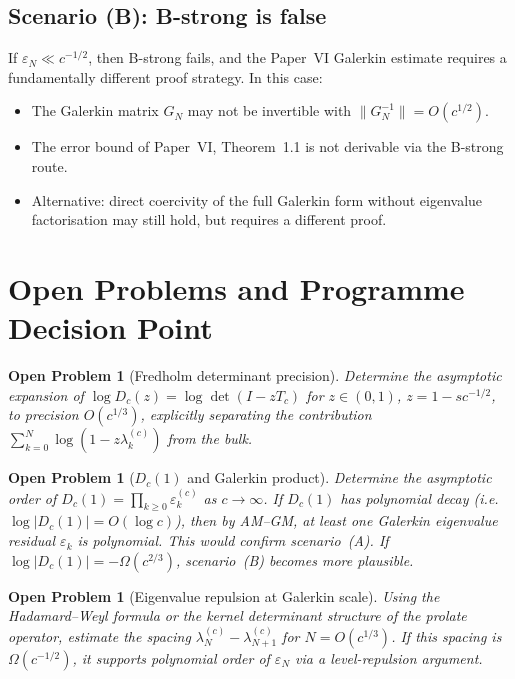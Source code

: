 \documentclass[12pt,a4paper]{article}
\newtheorem{openproblem}[theorem]{Open Problem}
\newcommand{\lam}[1]{\lambda_{#1}^{(c)}}
\newcommand{\Tc}{T_c}
\newcommand{\Dc}{D_c}
\begin{document}
\subsection{Scenario (B): B-strong is false}

If $\varepsilon_N \ll c^{-1/2}$, then B-strong fails,
and the Paper~VI Galerkin estimate requires
a fundamentally different proof strategy.
In this case:
\begin{itemize}[nosep]
  \item The Galerkin matrix $G_N$ may not be
        invertible with $\|G_N^{-1}\| = O(c^{1/2})$.
  \item The error bound of Paper~VI, Theorem~1.1
        is not derivable via the B-strong route.
  \item Alternative: direct coercivity of the
        full Galerkin form without eigenvalue
        factorisation may still hold, but
        requires a different proof.
\end{itemize}

\section{Open Problems and Programme Decision Point}
\label{sec:decision}

\begin{openproblem}[Fredholm determinant precision]
\label{op:fredholm_precision}
Determine the asymptotic expansion of
$\log \Dc(z) = \log \det(I - z\Tc)$
for $z \in (0,1)$, $z = 1 - sc^{-1/2}$, to precision
$O(c^{1/3})$, explicitly separating the contribution
$\sum_{k=0}^N \log(1 - z\lam{k})$ from the bulk.
\end{openproblem}

\begin{openproblem}[$D_c(1)$ and Galerkin product]
\label{op:dc1}
Determine the asymptotic order of
$\Dc(1) = \prod_{k \geq 0} \varepsilon_k^{(c)}$
as $c \to \infty$.
If $\Dc(1)$ has polynomial decay (i.e.
$\log |\Dc(1)| = O(\log c)$),
then by AM--GM, at least one Galerkin eigenvalue
residual $\varepsilon_k$ is polynomial.
\emph{This would confirm scenario~(A).}
If $\log |\Dc(1)| = -\Omega(c^{2/3})$, scenario~(B)
becomes more plausible.
\end{openproblem}

\begin{openproblem}[Eigenvalue repulsion at Galerkin scale]
\label{op:repulsion}
Using the Hadamard--Weyl formula or the kernel
determinant structure of the prolate operator,
estimate the spacing $\lam{N} - \lam{N+1}$
for $N = O(c^{1/3})$.
If this spacing is $\Omega(c^{-1/2})$,
it supports polynomial order of $\varepsilon_N$
via a level-repulsion argument.
\end{openproblem}
\end{document}
